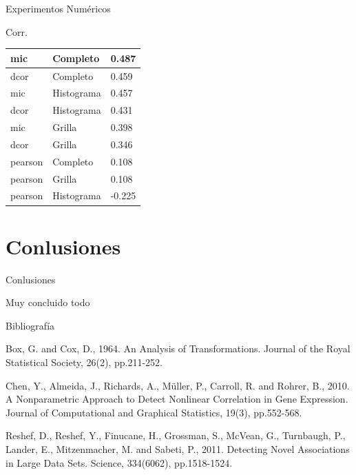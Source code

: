 \documentclass{beamer}
\begin{document}
\begin{frame}{Experimentos Numéricos}
    \begin{block}{Corr.} 
        \begin{table}[H]
            \centering
            \begin{tabular}{|l|l|l|}\hline
            mic     & Completo    & 0.487  \\\hline
            dcor    & Completo    & 0.459  \\
            mic     & Histograma  & 0.457  \\
            dcor    & Histograma  & 0.431  \\
            mic     & Grilla      & 0.398  \\
            dcor    & Grilla      & 0.346 \\
            pearson & Completo    & 0.108  \\
            pearson & Grilla      & 0.108  \\
            pearson & Histograma  & -0.225 \\\hline
            \end{tabular}
        \end{table}
    \end{block}
\end{frame}

\section{Conlusiones}

\begin{frame}{Conlusiones}
    
    Muy concluido todo
\end{frame}


\begin{frame}{Bibliografía}
    \begin{thebibliography}{9}
    Box, G. and Cox, D., 1964. An Analysis of Transformations. Journal of the Royal Statistical Society, 26(2), pp.211-252.
    
    Chen, Y., Almeida, J., Richards, A., Müller, P., Carroll, R. and Rohrer, B., 2010. A Nonparametric Approach to Detect Nonlinear Correlation in Gene Expression. Journal of Computational and Graphical Statistics, 19(3), pp.552-568.
    
    Reshef, D., Reshef, Y., Finucane, H., Grossman, S., McVean, G., Turnbaugh, P., Lander, E., Mitzenmacher, M. and Sabeti, P., 2011. Detecting Novel Associations in Large Data Sets. Science, 334(6062), pp.1518-1524.
    
    \end{thebibliography}
\end{frame}
\end{document}

